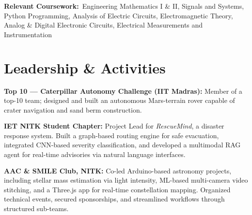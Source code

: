 \documentclass[10.5pt]{article}
\begin{document}
\vspace{0.5em}
\noindent\textbf{\small Relevant Coursework:}\ {\small\color{mid}Engineering Mathematics I \& II, Signals and Systems, Python Programming, Analysis of Electric Circuits, Electromagnetic Theory, Analog \& Digital Electronic Circuits, Electrical Measurements and Instrumentation}

\section*{Leadership \& Activities}

\noindent\textbf{Top 10 --- Caterpillar Autonomy Challenge (IIT Madras):}
{\small\color{dark} Member of a top-10 team; designed and built an autonomous Mars-terrain rover capable of crater navigation and sand berm construction.}

\vspace{0.4em}
\noindent\textbf{IET NITK Student Chapter:}
{\small\color{dark} Project Lead for \textit{RescueMind}, a disaster response system. Built a graph-based routing engine for safe evacuation, integrated CNN-based severity classification, and developed a multimodal RAG agent for real-time advisories via natural language interfaces.}

\vspace{0.4em}
\noindent\textbf{AAC \& SMILE Club, NITK:}
{\small\color{dark} Co-led Arduino-based astronomy projects, including stellar mass estimation via light intensity, ML-based multi-camera video stitching, and a Three.js app for real-time constellation mapping. Organized technical events, secured sponsorships, and streamlined workflows through structured sub-teams.}
\end{document}

